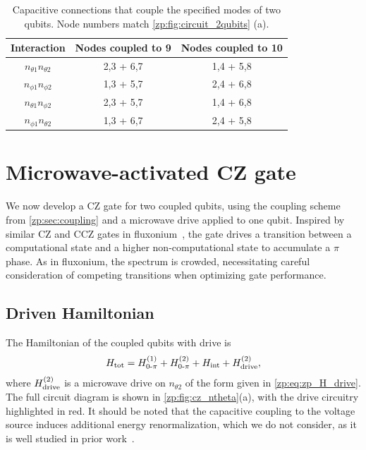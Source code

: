 \begin{table}[htbp]
\centering
\setlength{\tabcolsep}{7pt}
\renewcommand{\arraystretch}{1.05}
\begin{tabular}{ccc}
\toprule
\small
Interaction                    & Nodes coupled to 9        & Nodes coupled to 10     \\ \midrule
$n_{\theta 1}n_{\theta 2}$  & 2,3 + 6,7         & 1,4 + 5,8       \\
$n_{\phi 1}n_{\phi 2}$      & 1,3 + 5,7         & 2,4 + 6,8       \\
$n_{\theta 1}n_{\phi 2}$    & 2,3 + 5,7         & 1,4 + 6,8       \\
$n_{\phi 1}n_{\theta 2}$    & 1,3 + 6,7         & 2,4 + 5,8       \\ \bottomrule
\end{tabular}
\caption[Capacitive connections coupling \zps modes.]{
Capacitive connections that couple the specified modes of two \zps qubits.
Node numbers match \cref{zp:fig:circuit_2qubits} (a).
}\label{zp:tab:coupling_table}
\end{table}

\section{Microwave-activated CZ gate}\label{zp:sec:cz}
We now develop a CZ gate for two coupled \zps qubits, using the coupling scheme from \cref{zp:sec:coupling} and a microwave drive applied to one qubit.
Inspired by similar CZ and CCZ gates in fluxonium~\cite{nesterov2018microwave,ficheux2021fast,mazhorin2026nativecczgatefluxonium}, the gate drives a transition between a computational state and a higher non-computational state to accumulate a $\pi$ phase.
As in fluxonium, the \zps spectrum is crowded, necessitating careful consideration of competing transitions when optimizing gate performance.

\subsection{Driven Hamiltonian}\label{zp:sec_sub:cz_drive_params}
The Hamiltonian of the coupled qubits with drive is
\begin{align}\label{zp:eq:H_total_and_drive_cz}
    H_{\rm tot} = H_{0\text{-}\pi}^{(1)} + H_{0\text{-}\pi}^{(2)} +H_{\rm int} +H_{\rm drive}^{(2)},
\end{align}
where $H_{\rm drive}^{(2)}$ is a microwave drive on $n_{\theta 2}$ of the form given in \cref{zp:eq:zp_H_drive}.
The full circuit diagram is shown in  \cref{zp:fig:cz_ntheta}(a), with the drive circuitry highlighted in red.
It should be noted that the capacitive coupling to the voltage source induces additional energy renormalization, which we do not consider, as it is well studied in prior work~\cite{paolo_control_2019}.

